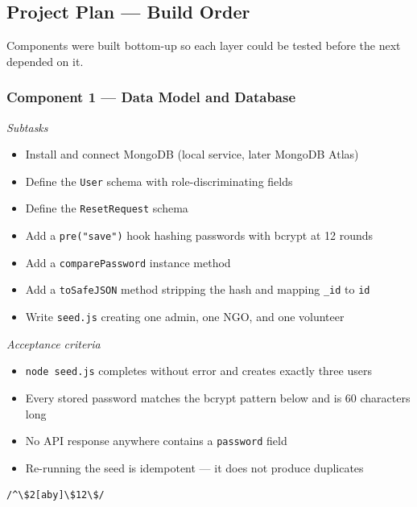 \documentclass[11pt,letterpaper]{article}
\begin{document}
\subsection{Project Plan --- Build Order}

Components were built bottom-up so each layer could be tested before the
next depended on it.

\subsubsection*{Component 1 --- Data Model and Database}
\textit{Subtasks}
\begin{itemize}
  \item Install and connect MongoDB (local service, later MongoDB Atlas)
  \item Define the \texttt{User} schema with role-discriminating fields
  \item Define the \texttt{ResetRequest} schema
  \item Add a \texttt{pre("save")} hook hashing passwords with bcrypt at 12 rounds
  \item Add a \texttt{comparePassword} instance method
  \item Add a \texttt{toSafeJSON} method stripping the hash and mapping
        \texttt{\_id} to \texttt{id}
  \item Write \texttt{seed.js} creating one admin, one NGO, and one volunteer
\end{itemize}
\textit{Acceptance criteria}
\begin{itemize}
  \item \texttt{node seed.js} completes without error and creates exactly three users
  \item Every stored password matches the bcrypt pattern below and is 60 characters long
  \item No API response anywhere contains a \texttt{password} field
  \item Re-running the seed is idempotent --- it does not produce duplicates
\end{itemize}
\begin{Verbatim}[fontsize=\small,xleftmargin=1.5em]
/^\$2[aby]\$12\$/
\end{Verbatim}
\end{document}

